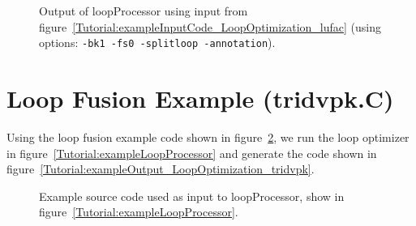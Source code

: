 \begin{figure}[!h]
{\indent
{\mySmallFontSize


\begin{latexonly}
   
\end{latexonly}

\begin{htmlonly}
   
\end{htmlonly}

}
}
\caption{Output of loopProcessor using input from figure~\ref{Tutorial:exampleInputCode_LoopOptimization_lufac}
    (using options: {\tt -bk1 -fs0  -splitloop -annotation}).}
\label{Tutorial:exampleOutput_LoopOptimization_lufac}
\end{figure}


\section{Loop Fusion Example (tridvpk.C)}

   Using the loop fusion example code shown in 
figure~\ref{Tutorial:exampleInputCode_LoopOptimization_tridvpk}, we run the loop optimizer in
figure~\ref{Tutorial:exampleLoopProcessor} and generate the code shown in 
figure~\ref{Tutorial:exampleOutput_LoopOptimization_tridvpk}.

\begin{figure}[!h]
{\indent
{\mySmallFontSize


\begin{latexonly}
   
\end{latexonly}

\begin{htmlonly}
   
\end{htmlonly}

}
}
\caption{Example source code used as input to loopProcessor, show in figure~\ref{Tutorial:exampleLoopProcessor}.}
\label{Tutorial:exampleInputCode_LoopOptimization_tridvpk}
\end{figure}

